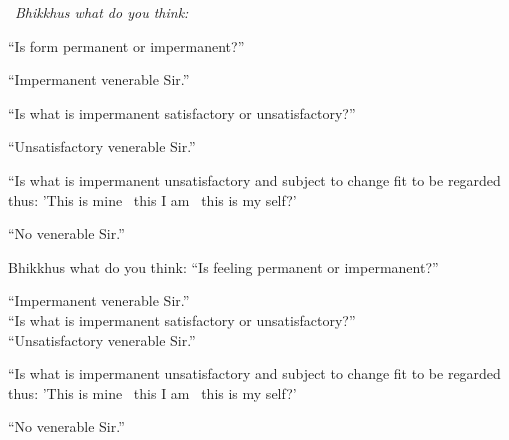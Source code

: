 \begin{english-only-leader}
  \anglebracketleft\ \hspace{-0.5mm}\textit{Bhikkhus what do you think:} \hspace{-0.5mm}\anglebracketright\
\end{english-only-leader}
  \begin{english-only-hangtogether}
    ``Is form permanent or impermanent?''
  \end{english-only-hangtogether}
  \begin{english-only-hangtogether}
  ``Impermanent venerable Sir.''
  \end{english-only-hangtogether}
  \begin{english-only-hangtogether}
  ``Is what is impermanent satisfactory or unsatisfactory?''
  \end{english-only-hangtogether}
  \begin{english-only-hangtogether}
  ``Unsatisfactory venerable Sir.''
  \end{english-only-hangtogether}
  \begin{english-only-hangtogether}
    ``Is what is impermanent unsatisfactory and subject to change fit to be regarded thus: 'This is mine \breathmark\ this I am \breathmark\ this is my self?'
  \end{english-only-hangtogether}
  \begin{english-only-hangtogether}
  ``No venerable Sir.''
  \end{english-only-hangtogether}

\begin{english-only-nohang}
  \begin{english-only-hang}
    Bhikkhus what do you think: ``Is feeling permanent or impermanent?''
  \end{english-only-hang}
  ``Impermanent venerable Sir.''\\
  ``Is what is impermanent satisfactory or unsatisfactory?''\\
  ``Unsatisfactory venerable Sir.''\\
  \begin{english-hangtogether}
    ``Is what is impermanent unsatisfactory and subject to change fit to be regarded thus: 'This is mine \breathmark\ this I am \breathmark\ this is my self?'
  \end{english-hangtogether}
  ``No venerable Sir.''
\end{english-only-nohang}

